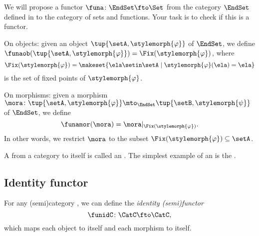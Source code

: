 
\begin{gradedexercise}
\label{ex:fixed-point-functor}

We will propose a functor $\funa \colon \EndSet \fto \Set$ from the category $\EndSet$ defined in  to the category of sets and functions. Your task is to check if this is a functor. 

On objects: given an object $\tup{\setA, \stylemorph{\varphi}}$ of $\EndSet$, we define $\funaob( \tup{\setA, \stylemorph{\varphi}}) = \Fix(\stylemorph{\varphi})$, where 
\begin{equation}
\Fix(\stylemorph{\varphi}) = \makeset{\ela \setin \setA \mid \stylemorph{\varphi}(\ela) = \ela}
\end{equation}
is the set of fixed points of $\stylemorph{\varphi}$. 

On morphisms: given a morphism $\mora \colon \tup{\setA, \stylemorph{\varphi}} \mto_\EndSet \tup{\setB, \stylemorph{\psi}}$ of $\EndSet$, we define
\begin{equation}
\funamor(\mora) = \mora \vert_{\Fix(\stylemorph{\varphi})}.
\end{equation}
In other words, we restrict $\mora$ to the subset $\Fix(\stylemorph{\varphi}) \subseteq \setA$. 
        
\end{gradedexercise}


A  from a category to itself is called an .
The simplest example of an  is the .

\subsection{Identity functor}
\label{sec:identity-functor}

\begin{definition}\label{def:identity-semifunctor}
    For any (semi)category \CatC, we can define the \emph{identity (semi)functor}
    \begin{equation}
        \funidC \colon \CatC \fto \CatC,
    \end{equation}
    which maps each object to itself and each morphism to itself.
\end{definition}

